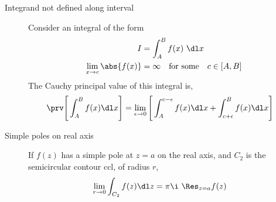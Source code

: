 \begin{description}
    \item[Integrand not defined along interval] Consider an integral of the form
        \begin{align}
            I                         & = \int_{A}^{B} f(x)\ \dl x             \\
            \lim_{x \to c} \abs{f(x)} & = \infty \quad \text{for some} \quad c
            \in [A, B]
        \end{align}
        The Cauchy principal value of this integral is,
        \begin{align}
            \prv \Bigg[\int_{A}^{B} f(x) \dl x\Bigg] & = \lim_{\epsilon \to 0}
            \Bigg[ \int_{A}^{c-\epsilon} f(x) \dl x
                + \int_{c + \epsilon}^{B} f(x) \dl x  \Bigg]
        \end{align}

    \item[Simple poles on real axis] If $ f(z) $ has a simple pole at $ z = a $ on
        the real axis, and $ C_2 $ is the semicircular contour ccl, of radius $ r $,
        \begin{align}
            \lim_{r \to 0} \int_{C_2} f(z) \dl z & = \pi\i\ \Res_{z = a}f(z)
        \end{align}
        \begin{figure}[H]
            \centering
        \end{figure}


\end{description}

